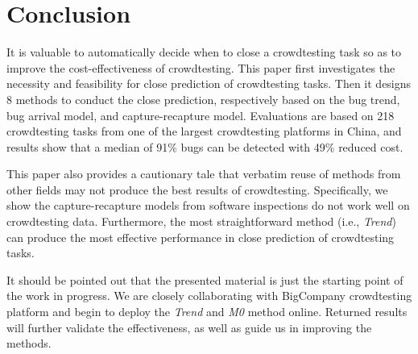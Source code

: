 \documentclass[sigconf,review, anonymous]{acmart}
\newcommand{\company}{BigCompany}
\begin{document}




\section{Conclusion}
\label{sec:conclusion}

It is valuable to automatically decide when to close a crowdtesting task so as to improve the cost-effectiveness of crowdtesting.
This paper first investigates the necessity and feasibility for close prediction of crowdtesting tasks.
Then it designs 8 methods to conduct the close prediction, respectively based on the bug trend, bug arrival model, and capture-recapture model.
Evaluations are based on 218 crowdtesting tasks from one of the largest crowdtesting platforms in China, and
results show that a median of 91\% bugs can be detected with 49\% reduced cost.

This paper also provides a cautionary tale that verbatim reuse of methods from other fields  may  not  produce  the  best  results  of  crowdtesting.
Specifically, we show the capture-recapture models from software inspections do not work well on crowdtesting data.
Furthermore, the most straightforward method (i.e., \textit{Trend}) can produce the most effective performance in close prediction of crowdtesting tasks.


It should be pointed out that the presented material is just the starting point of the work in progress. We are closely collaborating with {\company} crowdtesting platform and begin to deploy the \textit{Trend} and \textit{M0} method online. 
Returned results will further validate the effectiveness, as well as guide us in improving the methods.
\end{document}
